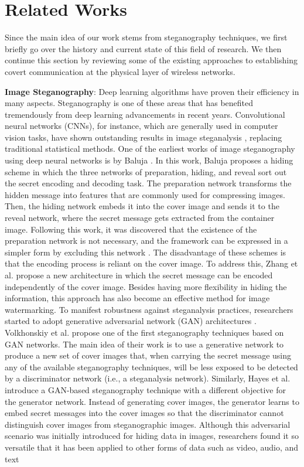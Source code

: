 \section{Related Works}
\label{s:related}
Since the main idea of our work stems from steganography techniques, we first briefly go over the history and current state of this field of research. We then continue this section by reviewing some of the existing approaches to establishing covert communication at the physical layer of wireless networks.

\textbf{Image Steganography}: Deep learning algorithms have proven their efficiency in many aspects. Steganography is one of these areas that has benefited tremendously from deep learning advancements in recent years. Convolutional neural networks (CNNs), for instance, which are generally used in computer vision tasks, have shown outstanding results in image steganalysis \cite{tan2014stacked,qian2015deep,xu2016structural}, replacing traditional statistical methods. One of the earliest works of image steganography using deep neural networks is by Baluja \cite{baluja2017hiding}. In this work, Baluja proposes a hiding scheme in which the three networks of preparation, hiding, and reveal sort out the secret encoding and decoding task. The preparation network transforms the hidden message into features that are commonly used for compressing images. Then, the hiding network embeds it into the cover image and sends it to the reveal network, where the secret message gets extracted from the container image. Following this work, it was discovered that the existence of the preparation network is not necessary, and the framework can be expressed in a simpler form by excluding this network \cite{zhang2021brief}. The disadvantage of these schemes is that the encoding process is reliant on the cover image. To address this, Zhang et al. \cite{zhang2020udh} propose a new architecture in which the secret message can be encoded independently of the cover image. Besides having more flexibility in hiding the information, this approach has also become an effective method for image watermarking. To manifest robustness against steganalysis practices, researchers started to adopt generative adversarial network (GAN) architectures \cite{goodfellow2014generative}. Volkhonskiy et al. \cite{volkhonskiy2020steganographic} propose one of the first steganography techniques based on GAN networks. The main idea of their work is to use a generative network to produce a new set of cover images that, when carrying the secret message using any of the available steganography techniques, will be less exposed to be detected by a discriminator network (i.e., a steganalysis network). Similarly, Hayes et al. \cite{hayes2017generating} introduce a GAN-based steganography technique with a different objective for the generator network. Instead of generating cover images, the generator learns to embed secret messages into the cover images so that the discriminator cannot distinguish cover images from steganographic images. Although this adversarial scenario was initially introduced for hiding data in images, researchers found it so versatile that it has been applied to other forms of data such as video, audio, and text 